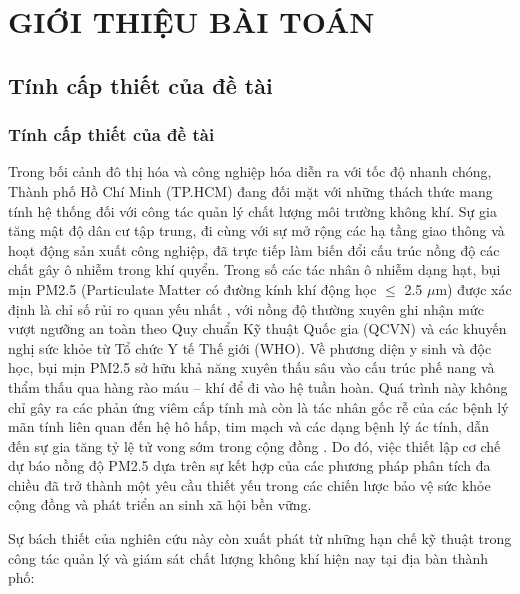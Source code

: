 \chapter{GIỚI THIỆU BÀI TOÁN}
\section{Tính cấp thiết của đề tài}
    \subsection{Tính cấp thiết của đề tài} \par 
    Trong bối cảnh đô thị hóa và công nghiệp hóa diễn ra với tốc độ nhanh chóng, Thành phố Hồ Chí Minh (TP.HCM) đang đối mặt với những thách thức mang tính hệ thống đối với công tác quản lý chất lượng môi trường không khí. Sự gia tăng mật độ dân cư tập trung, đi cùng với sự mở rộng các hạ tầng giao thông và hoạt động sản xuất công nghiệp, đã trực tiếp làm biến đổi cấu trúc nồng độ các chất gây ô nhiễm trong khí quyển. Trong số các tác nhân ô nhiễm dạng hạt, bụi mịn PM2.5 (Particulate Matter có đường kính khí động học $\leq$ 2.5 $\mu$m) được xác định là chỉ số rủi ro quan yếu nhất \cite{Seinfeld2016}, với nồng độ thường xuyên ghi nhận mức vượt ngưỡng an toàn theo Quy chuẩn Kỹ thuật Quốc gia (QCVN) và các khuyến nghị sức khỏe từ Tổ chức Y tế Thế giới (WHO).
    Về phương diện y sinh và độc học, bụi mịn PM2.5 sở hữu khả năng xuyên thấu sâu vào cấu trúc phế nang và thẩm thấu qua hàng rào máu – khí để đi vào hệ tuần hoàn. Quá trình này không chỉ gây ra các phản ứng viêm cấp tính mà còn là tác nhân gốc rễ của các bệnh lý mãn tính liên quan đến hệ hô hấp, tim mạch và các dạng bệnh lý ác tính, dẫn đến sự gia tăng tỷ lệ tử vong sớm trong cộng đồng \cite{Le2024}. Do đó, việc thiết lập cơ chế dự báo nồng độ PM2.5 dựa trên sự kết hợp của các phương pháp phân tích đa chiều đã trở thành một yêu cầu thiết yếu trong các chiến lược bảo vệ sức khỏe cộng đồng và phát triển an sinh xã hội bền vững.
    
    Sự bách thiết của nghiên cứu này còn xuất phát từ những hạn chế kỹ thuật trong công tác quản lý và giám sát chất lượng không khí hiện nay tại địa bàn thành phố:
    
